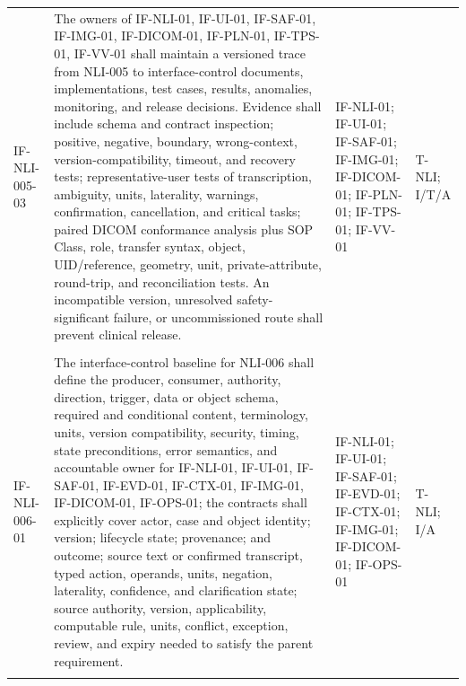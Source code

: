 \documentclass[11pt,letterpaper]{article}
\begin{document}
\begin{scriptsize}
\begin{longtable}{@{}L{0.14\textwidth}L{0.49\textwidth}L{0.19\textwidth}L{0.10\textwidth}@{}}
\addlinespace[2pt]
\mbox{IF-NLI-005-03} & The owners of IF-NLI-01, IF-UI-01, IF-SAF-01, IF-IMG-01, IF-DICOM-01, IF-PLN-01, IF-TPS-01, IF-VV-01 shall maintain a versioned trace from NLI-005 to interface-control documents, implementations, test cases, results, anomalies, monitoring, and release decisions. Evidence shall include schema and contract inspection; positive, negative, boundary, wrong-context, version-compatibility, timeout, and recovery tests; representative-user tests of transcription, ambiguity, units, laterality, warnings, confirmation, cancellation, and critical tasks; paired DICOM conformance analysis plus SOP Class, role, transfer syntax, object, UID\slash\allowbreak{}reference, geometry, unit, private-attribute, round-trip, and reconciliation tests. An incompatible version, unresolved safety-significant failure, or uncommissioned route shall prevent clinical release. & IF-NLI-01; IF-UI-01; IF-SAF-01; IF-IMG-01; IF-DICOM-01; IF-PLN-01; IF-TPS-01; IF-VV-01 & T-NLI; I\slash\allowbreak{}T\slash\allowbreak{}A \\
\addlinespace[2pt]
 \\
\addlinespace[2pt]
\mbox{IF-NLI-006-01} & The interface-control baseline for NLI-006 shall define the producer, consumer, authority, direction, trigger, data or object schema, required and conditional content, terminology, units, version compatibility, security, timing, state preconditions, error semantics, and accountable owner for IF-NLI-01, IF-UI-01, IF-SAF-01, IF-EVD-01, IF-CTX-01, IF-IMG-01, IF-DICOM-01, IF-OPS-01; the contracts shall explicitly cover actor, case and object identity; version; lifecycle state; provenance; and outcome; source text or confirmed transcript, typed action, operands, units, negation, laterality, confidence, and clarification state; source authority, version, applicability, computable rule, units, conflict, exception, review, and expiry needed to satisfy the parent requirement. & IF-NLI-01; IF-UI-01; IF-SAF-01; IF-EVD-01; IF-CTX-01; IF-IMG-01; IF-DICOM-01; IF-OPS-01 & T-NLI; I\slash\allowbreak{}A \\
\addlinespace[2pt]

\end{longtable}
\end{scriptsize}
\end{document}
